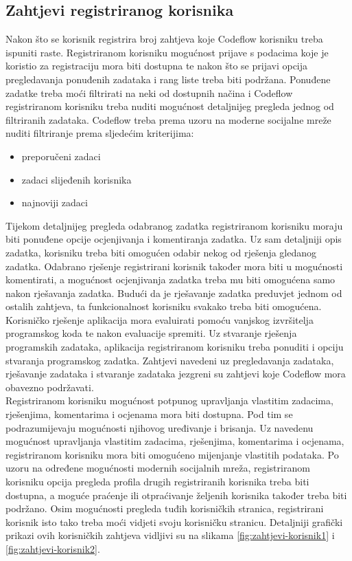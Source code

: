 \documentclass[times, utf8, zavrsni]{fer}
\begin{document}
			\subsection{Zahtjevi registriranog korisnika}
			Nakon što se korisnik registrira broj zahtjeva koje Codeflow korisniku treba ispuniti raste. Registriranom korisniku mogućnost prijave s podacima koje je koristio za registraciju mora biti dostupna te nakon što se prijavi opcija pregledavanja ponuđenih zadataka i rang liste treba biti podržana. Ponuđene zadatke treba moći filtrirati na neki od dostupnih načina i Codeflow registriranom korisniku treba nuditi mogućnost detaljnijeg pregleda jednog od filtriranih zadataka. Codeflow treba prema uzoru na moderne socijalne mreže nuditi filtriranje prema sljedećim kriterijima: 
			\begin{itemize}
				\item preporučeni zadaci
				\item zadaci slijeđenih korisnika
				\item najnoviji zadaci
			\end{itemize}
			Tijekom detaljnijeg pregleda odabranog zadatka registriranom korisniku moraju biti ponuđene opcije ocjenjivanja i komentiranja zadatka. Uz sam detaljniji opis zadatka, korisniku treba biti omogućen odabir nekog od rješenja gledanog zadatka. Odabrano rješenje registrirani korisnik također mora biti u mogućnosti komentirati, a mogućnost ocjenjivanja zadatka treba mu biti omogućena samo nakon rješavanja zadatka. Budući da je rješavanje zadatka preduvjet jednom od ostalih zahtjeva, ta funkcionalnost  korisniku svakako treba biti omogućena. Korisničko rješenje aplikacija mora evaluirati pomoću vanjskog izvršitelja programskog koda te nakon evaluacije spremiti. Uz stvaranje rješenja programskih zadataka, aplikacija registriranom korisniku treba ponuditi i opciju stvaranja programskog zadatka. Zahtjevi navedeni uz pregledavanja zadataka, rješavanje zadataka i stvaranje zadataka jezgreni su zahtjevi koje Codeflow mora obavezno podržavati.\\ Registriranom korisniku mogućnost potpunog upravljanja vlastitim zadacima, rješenjima, komentarima i ocjenama mora biti dostupna. Pod tim se podrazumijevaju  mogućnosti njihovog uređivanje i brisanja. Uz navedenu mogućnost upravljanja vlastitim zadacima, rješenjima, komentarima i ocjenama, registriranom korisniku mora biti omogućeno mijenjanje vlastitih podataka. Po uzoru na određene mogućnosti modernih socijalnih mreža, registriranom korisniku opcija pregleda profila drugih registriranih korisnika treba biti dostupna, a moguće praćenje ili otpraćivanje željenih korisnika također treba biti podržano. Osim mogućnosti pregleda tuđih korisničkih stranica, registrirani korisnik isto tako treba moći vidjeti svoju korisničku stranicu. Detaljniji grafički prikazi ovih korisničkih zahtjeva vidljivi su na slikama \ref{fig:zahtjevi-korisnik1} i \ref{fig:zahtjevi-korisnik2}.
\end{document}
